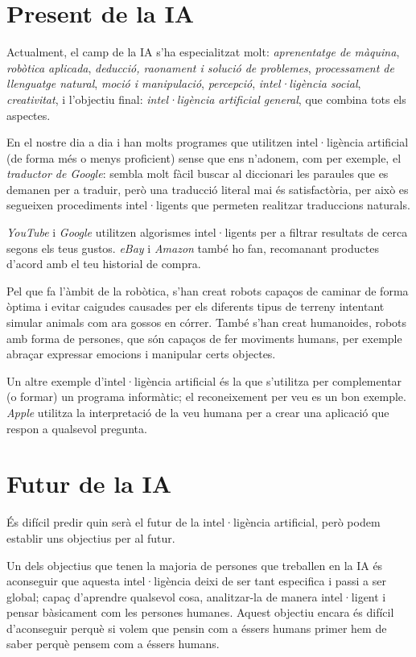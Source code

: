 \section {Present de la IA}
Actualment, el camp de la IA s'ha especialitzat molt: \emph{aprenentatge de màquina}, \emph{robòtica aplicada}, \emph{deducció, raonament i solució de problemes}, \emph{processament de llenguatge natural}, \emph{moció i manipulació}, \emph{percepció}, \emph{intel·ligència social}, \emph{creativitat}, i l'objectiu final: \emph{intel·ligència artificial general}, que combina tots els aspectes.

En el nostre dia a dia i han molts programes que utilitzen intel·ligència artificial (de forma més o menys proficient) sense que ens n'adonem, com per exemple, el \emph{traductor de Google}: sembla molt fàcil buscar al diccionari les paraules que es demanen per a traduir, però una traducció literal mai és satisfactòria, per això es segueixen procediments intel·ligents que permeten realitzar traduccions naturals.

\emph{YouTube} i \emph{Google} utilitzen algorismes intel·ligents per a filtrar resultats de cerca segons els teus gustos. \emph{eBay} i \emph{Amazon} també ho fan, recomanant productes d'acord amb el teu historial de compra.


Pel que fa l'àmbit de la robòtica, s'han creat robots capaços de caminar de forma òptima i evitar caigudes causades per els diferents tipus de terreny intentant simular animals com
ara gossos en córrer. També s'han creat humanoides, robots amb forma de persones, que són capaços de fer moviments humans, per exemple abraçar expressar emocions i manipular certs objectes. \cite{bostondynamics}


Un altre exemple d'intel·ligència artificial és la que s'utilitza per complementar (o formar) un programa informàtic; el reconeixement per veu es un bon exemple. \emph{Apple} utilitza la interpretació de la veu humana per a crear una aplicació que respon a qualsevol pregunta.

\section {Futur de la IA}
És difícil predir quin serà el futur de la intel·ligència artificial, però podem establir uns objectius per al futur.

Un dels objectius que tenen la majoria de persones que treballen en la IA és aconseguir que aquesta intel·ligència deixi de ser tant especifica i passi a ser global; capaç d'aprendre
qualsevol cosa, analitzar-la de manera intel·ligent i pensar bàsicament com les persones humanes. Aquest objectiu encara és difícil d'aconseguir perquè si volem que pensin com a éssers
humans primer hem de saber perquè pensem com a éssers humans.

